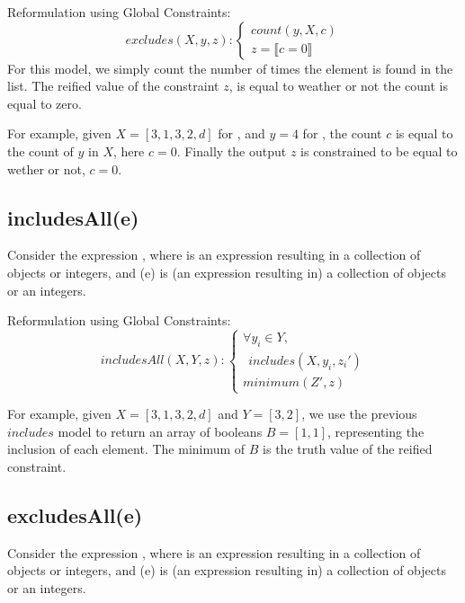 Reformulation using Global Constraints:
\begin{equation}\label{csp:excludes}
    excludes(X,y,z):
    \begin{cases}
        count(y,X,c)\\
        z = \llbracket c=0 \rrbracket
    \end{cases}
\end{equation}
For this model, we simply count the number of times the element is found in the list.
The reified value of the constraint $z$, is equal to weather or not the count is equal to zero.

For example, given $X=[3,1,3,2,d]$ for , and $y=4$ for , the count $c$ is equal to the count of $y$ in $X$, here $c=0$.
Finally the output $z$ is constrained to be equal to wether or not, $c=0$.

\newpage\subsection{includesAll(e)}
Consider the expression , where  is an expression resulting in a collection of objects or integers, and \inelineocl(e) is (an expression resulting in) a collection of objects or an integers.

Reformulation using Global Constraints:
\begin{equation}\label{csp:includesAll}
    includesAll(X,Y,z):
    \begin{cases}
        \forall y_i \in Y,\\
        ~~includes(X,y_i,z_i')\\
        minimum(Z',z)
    \end{cases}
\end{equation}

For example, given $X=[3,1,3,2,d]$ and $Y=[3,2]$, we use the previous $includes$ model to return an array of booleans $B=[1,1]$, representing the inclusion of each element.
The minimum of $B$ is the truth value of the reified constraint. 

\subsection{excludesAll(e)}
Consider the expression , where  is an expression resulting in a collection of objects or integers, and \inelineocl(e) is (an expression resulting in) a collection of objects or an integers.

